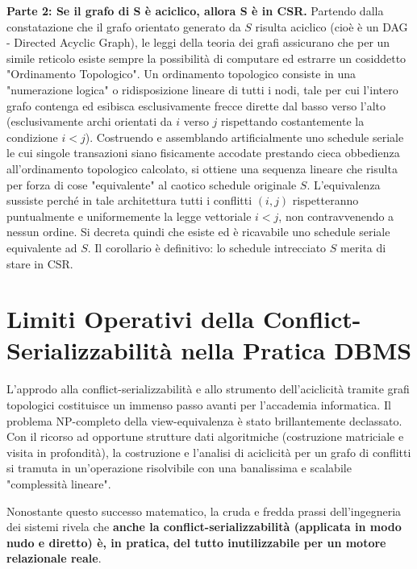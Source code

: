 \textbf{Parte 2: Se il grafo di S è aciclico, allora S è in CSR.}
Partendo dalla constatazione che il grafo orientato generato da $S$ risulta aciclico (cioè è un DAG - Directed Acyclic Graph), le leggi della teoria dei grafi assicurano che per un simile reticolo esiste sempre la possibilità di computare ed estrarre un cosiddetto "Ordinamento Topologico". Un ordinamento topologico consiste in una "numerazione logica" o ridisposizione lineare di tutti i nodi, tale per cui l'intero grafo contenga ed esibisca esclusivamente frecce dirette dal basso verso l'alto (esclusivamente archi orientati da $i$ verso $j$ rispettando costantemente la condizione $i < j$). Costruendo e assemblando artificialmente uno schedule seriale le cui singole transazioni siano fisicamente accodate prestando cieca obbedienza all'ordinamento topologico calcolato, si ottiene una sequenza lineare che risulta per forza di cose "equivalente" al caotico schedule originale $S$. L'equivalenza sussiste perché in tale architettura tutti i conflitti $(i,j)$ rispetteranno puntualmente e uniformemente la legge vettoriale $i < j$, non contravvenendo a nessun ordine. Si decreta quindi che esiste ed è ricavabile uno schedule seriale equivalente ad $S$. Il corollario è definitivo: lo schedule intrecciato $S$ merita di stare in CSR.

\section{Limiti Operativi della Conflict-Serializzabilità nella Pratica DBMS}

L'approdo alla conflict-serializzabilità e allo strumento dell'aciclicità tramite grafi topologici costituisce un immenso passo avanti per l'accademia informatica. Il problema NP-completo della view-equivalenza è stato brillantemente declassato. Con il ricorso ad opportune strutture dati algoritmiche (costruzione matriciale e visita in profondità), la costruzione e l'analisi di aciclicità per un grafo di conflitti si tramuta in un'operazione risolvibile con una banalissima e scalabile "complessità lineare".

Nonostante questo successo matematico, la cruda e fredda prassi dell'ingegneria dei sistemi rivela che \textbf{anche la conflict-serializzabilità (applicata in modo nudo e diretto) è, in pratica, del tutto inutilizzabile per un motore relazionale reale}.

